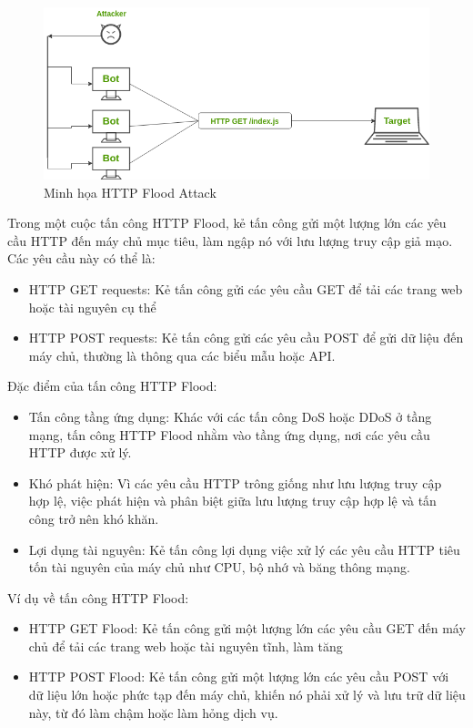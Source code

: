 \documentclass[a4paper]{article}
\begin{document}
\begin{itemize}
    \begin{figure}
        \centering
        \includegraphics[width=0.6\linewidth]{images/http-flood.png}
        \caption{Minh họa HTTP Flood Attack\cite{geeksforgeeks_ddos_2}}
        \label{fig:http-flood}
    \end{figure}
    Trong một cuộc tấn công HTTP Flood, kẻ tấn công gửi một lượng lớn các yêu cầu HTTP đến máy chủ mục tiêu, làm ngập nó với lưu lượng truy cập giả mạo. Các yêu cầu này có thể là:
    \begin{itemize}[label={}]
        \item HTTP GET requests: Kẻ tấn công gửi các yêu cầu GET để tải các trang web hoặc tài nguyên cụ thể
        \item HTTP POST requests: Kẻ tấn công gửi các yêu cầu POST để gửi dữ liệu đến máy chủ, thường là thông qua các biểu mẫu hoặc API.
    \end{itemize}
    Đặc điểm của tấn công HTTP Flood:
    \begin{itemize}[label={}]
        \item Tấn công tầng ứng dụng: Khác với các tấn công DoS hoặc DDoS ở tầng mạng, tấn công HTTP Flood nhằm vào tầng ứng dụng, nơi các yêu cầu HTTP được xử lý.
        \item Khó phát hiện: Vì các yêu cầu HTTP trông giống như lưu lượng truy cập hợp lệ, việc phát hiện và phân biệt giữa lưu lượng truy cập hợp lệ và tấn công trở nên khó khăn.
        \item Lợi dụng tài nguyên: Kẻ tấn công lợi dụng việc xử lý các yêu cầu HTTP tiêu tốn tài nguyên của máy chủ như CPU, bộ nhớ và băng thông mạng.
    \end{itemize}
    Ví dụ về tấn công HTTP Flood:
    \begin{itemize}[label={}]
        \item HTTP GET Flood: Kẻ tấn công gửi một lượng lớn các yêu cầu GET đến máy chủ để tải các trang web hoặc tài nguyên tĩnh, làm tăng
        \item HTTP POST Flood: Kẻ tấn công gửi một lượng lớn các yêu cầu POST với dữ liệu lớn hoặc phức tạp đến máy chủ, khiến nó phải xử lý và lưu trữ dữ liệu này, từ đó làm chậm hoặc làm hỏng dịch vụ.

\end{itemize}
\end{itemize}
\end{document}
